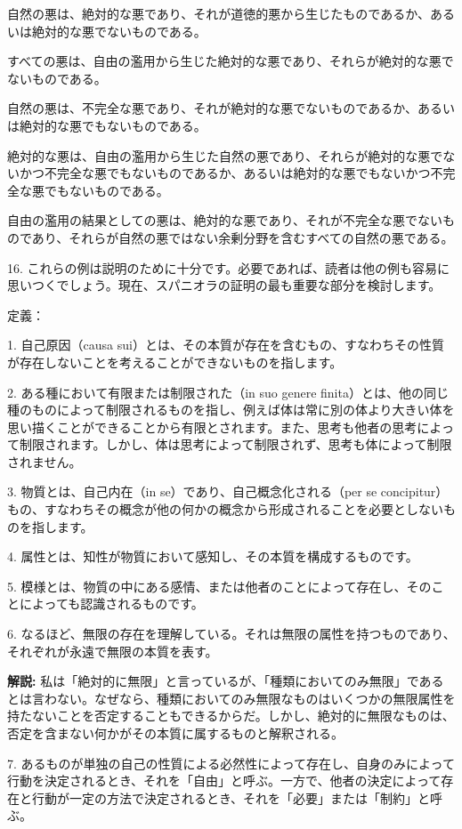 \documentclass[a4paper,11pt,openany]{ltjsbook}
\begin{document}
自然の悪は、絶対的な悪であり、それが道徳的悪から生じたものであるか、あるいは絶対的な悪でないものである。

すべての悪は、自由の濫用から生じた絶対的な悪であり、それらが絶対的な悪でないものである。

自然の悪は、不完全な悪であり、それが絶対的な悪でないものであるか、あるいは絶対的な悪でもないものである。

絶対的な悪は、自由の濫用から生じた自然の悪であり、それらが絶対的な悪でないかつ不完全な悪でもないものであるか、あるいは絶対的な悪でもないかつ不完全な悪でもないものである。

自由の濫用の結果としての悪は、絶対的な悪であり、それが不完全な悪でないものであり、それらが自然の悪ではない余剰分野を含むすべての自然の悪である。

16. これらの例は説明のために十分です。必要であれば、読者は他の例も容易に思いつくでしょう。現在、スパニオラの証明の最も重要な部分を検討します。

定義：

1. 自己原因（causa sui）とは、その本質が存在を含むもの、すなわちその性質が存在しないことを考えることができないものを指します。

2. ある種において有限または制限された（in suo genere finita）とは、他の同じ種のものによって制限されるものを指し、例えば体は常に別の体より大きい体を思い描くことができることから有限とされます。また、思考も他者の思考によって制限されます。しかし、体は思考によって制限されず、思考も体によって制限されません。

3. 物質とは、自己内在（in se）であり、自己概念化される（per se concipitur）もの、すなわちその概念が他の何かの概念から形成されることを必要としないものを指します。

4. 属性とは、知性が物質において感知し、その本質を構成するものです。

5. 模様とは、物質の中にある感情、または他者のことによって存在し、そのことによっても認識されるものです。

6. なるほど、無限の存在を理解している。それは無限の属性を持つものであり、それぞれが永遠で無限の本質を表す。

\textbf{解説:} 私は「絶対的に無限」と言っているが、「種類においてのみ無限」であるとは言わない。なぜなら、種類においてのみ無限なものはいくつかの無限属性を持たないことを否定することもできるからだ。しかし、絶対的に無限なものは、否定を含まない何かがその本質に属するものと解釈される。

7. あるものが単独の自己の性質による必然性によって存在し、自身のみによって行動を決定されるとき、それを「自由」と呼ぶ。一方で、他者の決定によって存在と行動が一定の方法で決定されるとき、それを「必要」または「制約」と呼ぶ。
\end{document}
